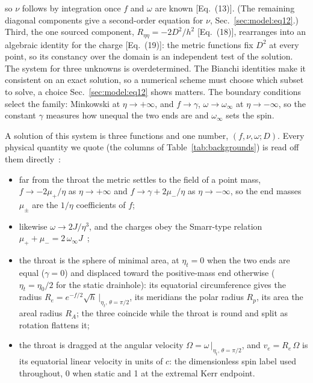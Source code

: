 \documentclass[twocolumn,floatfix,aps,prd,superscriptaddress,nofootinbib]{revtex4-2}
\begin{document}
so $\nu$ follows by integration once $f$ and $\omega$ are known [Eq.~(13)]. (The remaining diagonal components give a second-order equation for $\nu$, Sec.~\ref{sec:model:eq12}.) Third, the one sourced component, $R_{\eta\eta}=-2D^2/h^2$ [Eq.~(18)], rearranges into an algebraic identity for the charge [Eq.~(19)]: the metric functions fix $D^2$ at every point, so its constancy over the domain is an independent test of the solution. The system for three unknowns is overdetermined. The Bianchi identities make it consistent on an exact solution, so a numerical scheme must choose which subset to solve, a choice Sec.~\ref{sec:model:eq12} shows matters. The boundary conditions select the family: Minkowski at $\eta\to+\infty$, and $f\to\gamma$, $\omega\to\omega_\infty$ at $\eta\to-\infty$, so the constant $\gamma$ measures how unequal the two ends are and $\omega_\infty$ sets the spin.

A solution of this system is three functions and one number, $(f,\nu,\omega;D)$. Every physical quantity we quote (the columns of Table~\ref{tab:backgrounds}) is read off them directly~\cite{kleihaus_kunz2014,chew2016}:
\begin{itemize}
\item far from the throat the metric settles to the field of a point mass, $f\to-2\mu_+/\eta$ as $\eta\to+\infty$ and $f\to\gamma+2\mu_-/\eta$ as $\eta\to-\infty$, so the end masses $\mu_\pm$ are the $1/\eta$ coefficients of $f$;
\item likewise $\omega\to2J/\eta^3$, and the charges obey the Smarr-type relation $\mu_++\mu_-=2\,\omega_\infty J$~\cite{chew2016};
\item the throat is the sphere of minimal area, at $\eta_t=0$ when the two ends are equal ($\gamma=0$) and displaced toward the positive-mass end otherwise ($\eta_t=\eta_0/2$ for the static drainhole): its equatorial circumference gives the radius $R_e=e^{-f/2}\sqrt{h}\,\big|_{\eta_t,\,\theta=\pi/2}$, its meridians the polar radius $R_p$, its area the areal radius $R_A$; the three coincide while the throat is round and split as rotation flattens it;
\item the throat is dragged at the angular velocity $\Omega=\omega\,\big|_{\eta_t,\,\theta=\pi/2}$, and $v_e=R_e\,\Omega$ is its equatorial linear velocity in units of $c$: the dimensionless spin label used throughout, 0 when static and 1 at the extremal Kerr endpoint.
\end{itemize}
\end{document}
